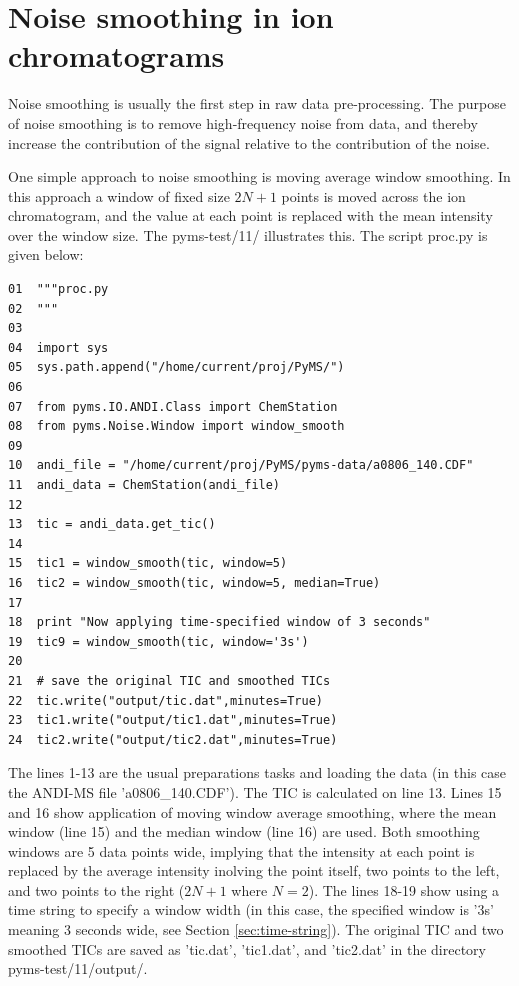 \section{Noise smoothing in ion chromatograms}


Noise smoothing is usually the first step in raw data pre-processing. The
purpose of noise smoothing is to remove high-frequency noise from data, and
thereby increase the contribution of the signal relative to the contribution
of the noise.

One simple approach to noise smoothing is moving average window smoothing.
In this approach a window of fixed size $2N+1$ points is moved across the ion
chromatogram, and the value at each point is replaced with the mean intensity
over the window size. The pyms-test/11/ illustrates this. The script proc.py
is given below:

\begin{verbatim}
01  """proc.py
02  """
03  
04  import sys
05  sys.path.append("/home/current/proj/PyMS/")
06  
07  from pyms.IO.ANDI.Class import ChemStation
08  from pyms.Noise.Window import window_smooth
09  
10  andi_file = "/home/current/proj/PyMS/pyms-data/a0806_140.CDF"
11  andi_data = ChemStation(andi_file)
12  
13  tic = andi_data.get_tic()
14  
15  tic1 = window_smooth(tic, window=5)
16  tic2 = window_smooth(tic, window=5, median=True)
17  
18  print "Now applying time-specified window of 3 seconds"
19  tic9 = window_smooth(tic, window='3s')
20  
21  # save the original TIC and smoothed TICs
22  tic.write("output/tic.dat",minutes=True)
23  tic1.write("output/tic1.dat",minutes=True)
24  tic2.write("output/tic2.dat",minutes=True)
\end{verbatim}

\noindent
The lines 1-13 are the usual preparations tasks and loading the data (in this
case the ANDI-MS file 'a0806\_140.CDF'). The TIC is calculated on line 13.
Lines 15 and 16 show application of moving window average smoothing, where
the mean window (line 15) and the median window (line 16) are used. Both
smoothing windows are 5 data points wide, implying that the intensity at
each point is replaced by the average intensity inolving the point itself,
two points to the left, and two points to the right ($2N+1$ where $N=2$).
The lines 18-19 show using a time string to specify a window width (in
this case, the specified window is '3s' meaning 3 seconds wide, see
Section \ref{sec:time-string}).  The original TIC and two smoothed TICs are
saved as 'tic.dat', 'tic1.dat', and 'tic2.dat' in the directory
pyms-test/11/output/.

